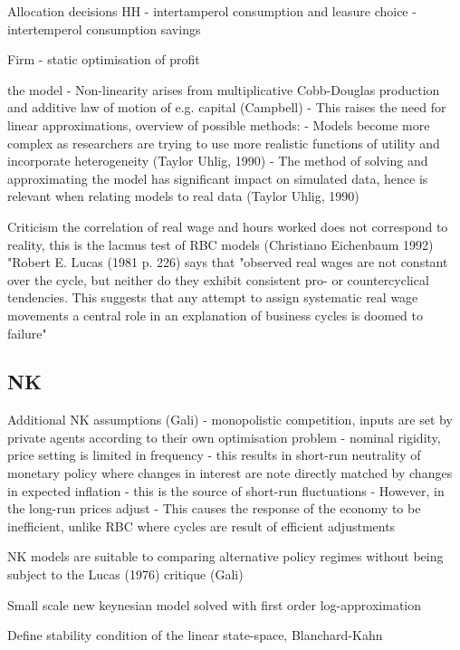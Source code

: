\documentclass[12pt,a4paper,english]{article} %
\begin{document}
	Allocation decisions
	HH
	- intertamperol consumption and leasure choice
	- intertemperol consumption savings 
	
	Firm
	- static optimisation of profit
	
	
	the model
	-	Non-linearity arises from multiplicative Cobb-Douglas production and additive law of motion of e.g. capital (Campbell)
	- This raises the need for linear approximations, overview of possible methods:
	- Models become more complex as researchers are trying to use more realistic functions of utility and incorporate heterogeneity (Taylor  Uhlig, 1990)
	- The method of solving and approximating the model has significant impact on simulated data, hence is relevant when relating models to real data (Taylor  Uhlig, 1990)
	
	

	
	
	Criticism
	the correlation of real wage and hours worked does not correspond to reality, this is the lacmus test of RBC models (Christiano Eichenbaum 1992)
	"Robert E. Lucas (1981 p. 226) says that "observed real wages are not constant over the cycle, but neither do they exhibit consistent pro- or countercyclical tendencies. This suggests that any attempt to assign systematic real wage movements a central role in an explanation of business cycles is doomed to failure" \cite{christiano_current_1992}
	
	
	\subsection{NK}
	
	Additional NK assumptions (Gali)
	- monopolistic competition, inputs are set by private agents according to their own optimisation problem
	- nominal rigidity, price setting is limited in frequency
		- this results in short-run neutrality of monetary policy where changes in interest are note directly matched by changes in expected inflation
		- this is the source of short-run fluctuations
		- However, in the long-run prices adjust 
	- This causes the response of the economy to be inefficient, unlike RBC where cycles are result of efficient adjustments
	
	NK models are suitable to comparing alternative policy regimes without being subject to the Lucas (1976) critique (Gali)
	
	Small scale new keynesian model solved with first order log-approximation \cite{herbst_bayesian_2016}
	
	Define stability condition of the linear state-space, Blanchard-Kahn
	
\end{document}
